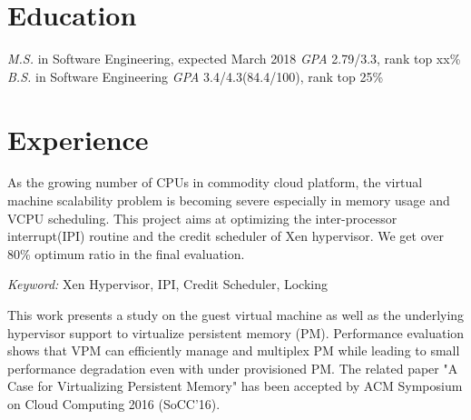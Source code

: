 \documentclass{resume}
\begin{document}


 
\section{Education}
\textit{M.S.} in Software Engineering, expected March 2018
\textit{GPA} 2.79/3.3, rank top xx\%
\textit{B.S.} in Software Engineering
\textit{GPA} 3.4/4.3(84.4/100), rank top 25\%



\section{Experience}

As the growing number of CPUs in commodity cloud platform, the virtual machine scalability problem is becoming severe especially in memory usage and VCPU scheduling.
This project aims at optimizing the inter-processor interrupt(IPI) routine and the credit scheduler of Xen hypervisor. We get over 80\% optimum ratio in the final evaluation.

\textit{Keyword: } Xen Hypervisor, IPI, Credit Scheduler, Locking


This work presents a study on the guest virtual machine as well as the underlying hypervisor support to virtualize persistent memory (PM). 
Performance evaluation shows that VPM can efficiently manage and multiplex PM while leading to small performance degradation even with under provisioned PM. 
The related paper "A Case for Virtualizing Persistent Memory" has been accepted by ACM Symposium on Cloud Computing 2016 (SoCC'16).
\end{document}
